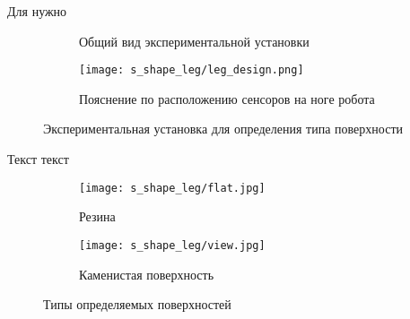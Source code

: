 Для нужно

\begin{figure}[H]
    \begin{subfigure}[t]{0.49\textwidth}
        \centering
        \caption{Общий вид экспериментальной установки}
        \label{fig:s_shape_leg/s_leg_setup.JPG}
    \end{subfigure}
    \begin{subfigure}[t]{0.49\textwidth}
        \centering\texttt{[image: s\_shape\_leg/leg\_design.png]}
        \caption{Пояснение по расположению сенсоров на ноге робота}
        \label{fig:s_shape_leg/leg_design.png}
    \end{subfigure}
    \caption{Экспериментальная установка для определения типа поверхности}
\end{figure}

Текст текст

\begin{figure}[H]
    \begin{subfigure}{0.49\textwidth}
        \centering\texttt{[image: s\_shape\_leg/flat.jpg]}
        \caption{Резина}
        \label{fig:s_shape_leg/flat.jpg}
    \end{subfigure}
    \hfill
    \begin{subfigure}{0.49\textwidth}
        \centering\texttt{[image: s\_shape\_leg/view.jpg]}
        \caption{Каменистая поверхность}
        \label{fig:s_shape_leg/view.jpg}
    \end{subfigure}
    \caption{Типы определяемых поверхностей}
\end{figure}

